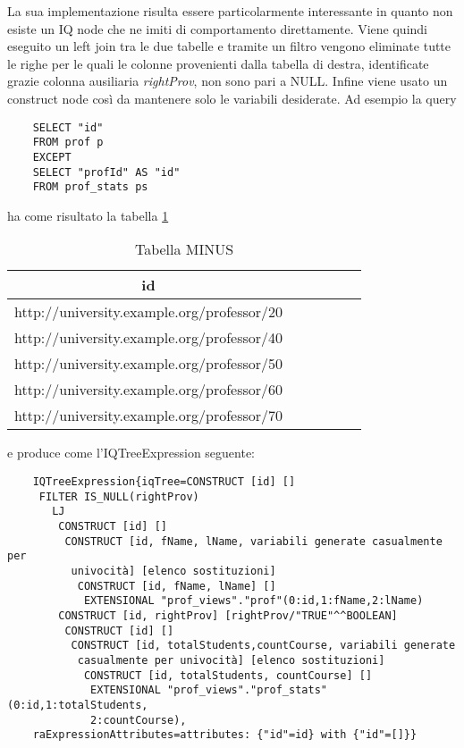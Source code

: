 La sua implementazione risulta essere particolarmente interessante in quanto non esiste un IQ node che ne imiti di comportamento direttamente. Viene quindi eseguito un left join tra le due
tabelle e tramite un filtro vengono eliminate tutte le righe per le quali le colonne provenienti dalla tabella di destra, identificate grazie colonna ausiliaria \textit{rightProv},
non sono pari a NULL. Infine viene usato un construct node così da mantenere solo le variabili desiderate. Ad esempio la query
\begin{verbatim}
    SELECT "id"
    FROM prof p
    EXCEPT
    SELECT "profId" AS "id"
    FROM prof_stats ps 
\end{verbatim}
ha come risultato la tabella \ref{tab:minus}
\begin{table}[ht]
    \centering
    \caption{Tabella MINUS}
    \label{tab:minus}
    \begin{tabular}{ | c | c | c | c | c | c |}
        \hline
        id                                         \\ \hline
        http://university.example.org/professor/20 \\ \hline
        http://university.example.org/professor/40 \\ \hline
        http://university.example.org/professor/50 \\ \hline
        http://university.example.org/professor/60 \\ \hline
        http://university.example.org/professor/70 \\
        \hline
    \end{tabular}
\end{table}
e produce come l'IQTreeExpression seguente:
\begin{verbatim}
    IQTreeExpression{iqTree=CONSTRUCT [id] []
     FILTER IS_NULL(rightProv)
       LJ
        CONSTRUCT [id] []
         CONSTRUCT [id, fName, lName, variabili generate casualmente per
          univocità] [elenco sostituzioni]
           CONSTRUCT [id, fName, lName] []
            EXTENSIONAL "prof_views"."prof"(0:id,1:fName,2:lName)
        CONSTRUCT [id, rightProv] [rightProv/"TRUE"^^BOOLEAN]
         CONSTRUCT [id] []
          CONSTRUCT [id, totalStudents,countCourse, variabili generate 
           casualmente per univocità] [elenco sostituzioni]
            CONSTRUCT [id, totalStudents, countCourse] []
             EXTENSIONAL "prof_views"."prof_stats"(0:id,1:totalStudents,
             2:countCourse),
    raExpressionAttributes=attributes: {"id"=id} with {"id"=[]}}
\end{verbatim}

